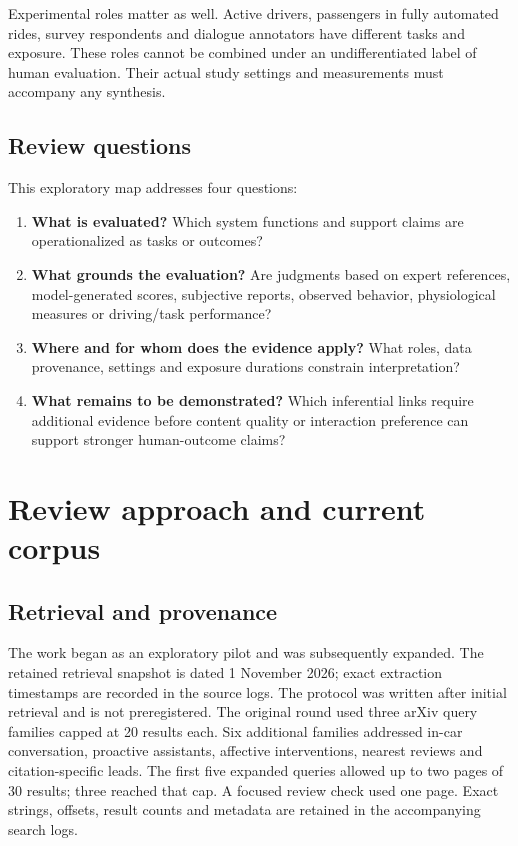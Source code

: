 \documentclass[11pt,a4paper]{article}
\providecommand{\tightlist}{\setlength{\itemsep}{0pt}\setlength{\parskip}{0pt}}
\begin{document}
Experimental roles matter as well. Active drivers, passengers in fully
automated rides, survey respondents and dialogue annotators have
different tasks and exposure. These roles cannot be combined under an
undifferentiated label of human evaluation. Their actual study settings
and measurements must accompany any synthesis.

\subsection{Review questions}\label{review-questions}

This exploratory map addresses four questions:

\begin{enumerate}
\def\labelenumi{\arabic{enumi}.}
\tightlist
\item
  \textbf{What is evaluated?} Which system functions and support claims
  are operationalized as tasks or outcomes?
\item
  \textbf{What grounds the evaluation?} Are judgments based on expert
  references, model-generated scores, subjective reports, observed
  behavior, physiological measures or driving/task performance?
\item
  \textbf{Where and for whom does the evidence apply?} What roles, data
  provenance, settings and exposure durations constrain interpretation?
\item
  \textbf{What remains to be demonstrated?} Which inferential links
  require additional evidence before content quality or interaction
  preference can support stronger human-outcome claims?
\end{enumerate}

\section{Review approach and current
corpus}\label{review-approach-and-current-corpus}

\subsection{Retrieval and provenance}\label{retrieval-and-provenance}

The work began as an exploratory pilot and was subsequently expanded.
The retained retrieval snapshot is dated 1 November 2026; exact
extraction timestamps are recorded in the source logs. The protocol was
written after initial retrieval and is not preregistered. The original
round used three arXiv query families capped at 20 results each. Six
additional families addressed in-car conversation, proactive assistants,
affective interventions, nearest reviews and citation-specific leads.
The first five expanded queries allowed up to two pages of 30 results;
three reached that cap. A focused review check used one page. Exact
strings, offsets, result counts and metadata are retained in the
accompanying search logs.
\end{document}
